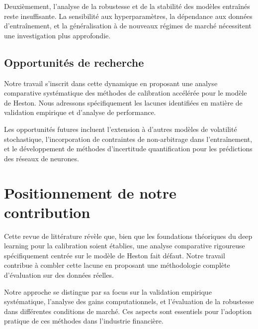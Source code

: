 Deuxièmement, l'analyse de la robustesse et de la stabilité des modèles entraînés reste insuffisante. La sensibilité aux hyperparamètres, la dépendance aux données d'entraînement, et la généralisation à de nouveaux régimes de marché nécessitent une investigation plus approfondie.

\subsection{Opportunités de recherche}

Notre travail s'inscrit dans cette dynamique en proposant une analyse comparative systématique des méthodes de calibration accélérée pour le modèle de Heston. Nous adressons spécifiquement les lacunes identifiées en matière de validation empirique et d'analyse de performance.

Les opportunités futures incluent l'extension à d'autres modèles de volatilité stochastique, l'incorporation de contraintes de non-arbitrage dans l'entraînement, et le développement de méthodes d'incertitude quantification pour les prédictions des réseaux de neurones.

\section{Positionnement de notre contribution}

Cette revue de littérature révèle que, bien que les foundations théoriques du deep learning pour la calibration soient établies, une analyse comparative rigoureuse spécifiquement centrée sur le modèle de Heston fait défaut. Notre travail contribue à combler cette lacune en proposant une méthodologie complète d'évaluation sur des données réelles.

Notre approche se distingue par sa focus sur la validation empirique systématique, l'analyse des gains computationnels, et l'évaluation de la robustesse dans différentes conditions de marché. Ces aspects sont essentiels pour l'adoption pratique de ces méthodes dans l'industrie financière.

